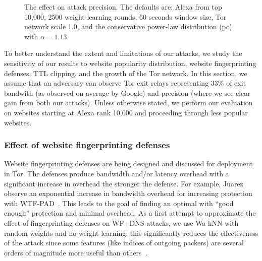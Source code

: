 \begin{figure}[t]
{    \label{fig:wfdns:var:scale}
}
\caption{The effect on attack precision. The defaults are: Alexa from top 10,000,
2500 weight-learning rounds,
60 seconds window size, Tor network scale 1.0, and the conservative
power-law distribution (pc) with $\alpha=1.13$.}
\label{fig:wfdns:var}
\end{figure}
\fi

To better understand the extent and limitations of our attacks, we
study the sensitivity of our results to website popularity distribution,
website fingerprinting defenses, TTL clipping, and the growth of the Tor
network.  In this section, we assume that an adversary can observe Tor
exit relays representing 33\% of exit bandwith (as observed on average
by Google) and precision (where we see clear gain from both our
attacks).  Unless otherwise stated, we perform our evaluation on
websites starting at Alexa rank 10,000 and proceeding through less
popular websites.



\subsubsection{Effect of website fingerprinting defenses}

Website fingerprinting defenses are being
designed and discussed for deployment in Tor.
The defenses produce bandwidth and/or latency overhead with a significant
increase in overhead the stronger the defense. For example, Juarez \ea
observe an exponential increase in bandwidth overhead for increasing protection
with WTF-PAD~\cite{DBLP:journals/corr/JuarezIPDW15}.
This leads to the goal of finding an optimal with ``good enough''
protection and minimal overhead.
As a first attempt to approximate the effect of fingerprinting
defenses on WF+DNS attacks, we use Wa-kNN with
random weights and no weight-learning: this significantly reduces the
effectiveness of the attack since some features (like indices of outgoing
packers) are several orders of magnitude more useful
than others~\cite{DBLP:journals/corr/JuarezIPDW15}.

